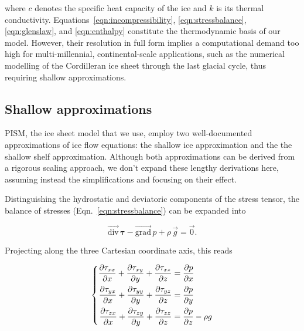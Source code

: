 \documentclass{article}
\renewcommand{\grad}[1]{\vec{\mathrm{grad}}\,#1}
\newcommand{\tensdiv}[1]{\vec{\mathrm{div}}\,#1}
\newcommand{\eqn}[1]{Eqn.~\ref{eqn:#1}}
\begin{document}
where $c$ denotes the specific heat capacity of the ice and $k$ is its thermal
conductivity. Equations~\ref{eqn:incompressibility}, \ref{eqn:stressbalance},
\ref{eqn:glenslaw}, and \ref{eqn:enthalpy} constitute the thermodynamic basis
of our model. However, their resolution in full form implies a computational
demand too high for multi-millennial, continental-scale applications, such as
the numerical modelling of the Cordilleran ice sheet through the last glacial
cycle, thus requiring shallow approximations.

\subsection{Shallow approximations}

PISM, the ice sheet model that we use, employ two well-documented
approximations of ice flow equations: the shallow ice approximation and the
the shallow shelf approximation. Although both approximations can be derived
from a rigorous scaling approach, we don't expand these lengthy derivations
here, assuming instead the simplifications and focusing on their effect.


Distinguishing the hydrostatic and deviatoric components of the stress tensor,
the balance of stresses (\eqn{stressbalance}) can be expanded into

\begin{equation}
    \label{eqn:stressbalance}
    \tensdiv{\bm\tau} - \grad{p} + \rho\,\vec{g} = \vec{0}.
\end{equation}

Projecting along the three Cartesian coordinate axis, this reads

\begin{equation}
    \label{eqn:fullstokes}
    \left\{\begin{aligned}
        \pdv{\tau_{xx}}{x} + \pdv{\tau_{xy}}{y} + \pdv{\tau_{xz}}{z}
            &= \pdv{p}{x} \\
        \pdv{\tau_{yx}}{x} + \pdv{\tau_{yy}}{y} + \pdv{\tau_{yz}}{z}
            &= \pdv{p}{y} \\
        \pdv{\tau_{zx}}{x} + \pdv{\tau_{zy}}{y} + \pdv{\tau_{zz}}{z}
            &= \pdv{p}{z} - \rho g
    \end{aligned}\right.
\end{equation}
\end{document}
